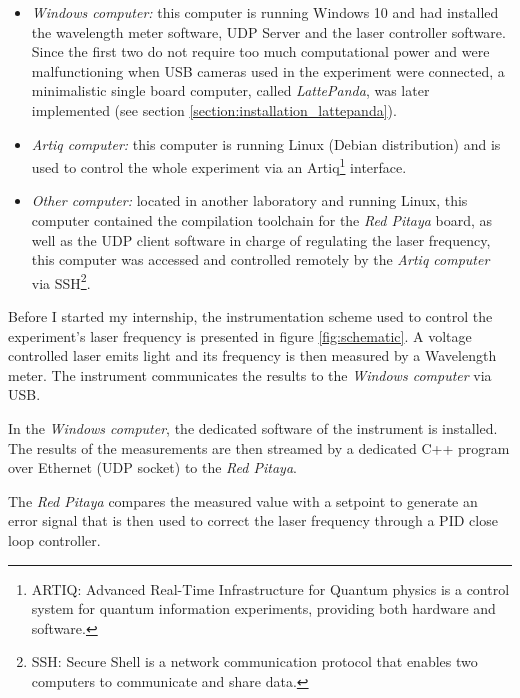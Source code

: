 \documentclass[a4paper,12pt]{article}
\begin{document}
\begin{itemize}
\itemsep 0em %
    \item \textit{Windows computer:} this computer is running Windows 10 and had installed the wavelength meter software, UDP Server and the laser controller software. Since the first two do not require too much computational power and were malfunctioning when USB cameras used in the experiment were connected, a minimalistic single board computer, called \textit{LattePanda}, was later implemented (see section \ref{section:installation_lattepanda}).
    \item \textit{Artiq computer:} this computer is running Linux (Debian distribution) and is used to control the whole experiment via an Artiq\footnote{ARTIQ: Advanced Real-Time Infrastructure for Quantum physics is a control system for quantum information experiments, providing both hardware and software.} interface.
    \item \textit{Other computer:} located in another laboratory and running Linux, this computer contained the compilation toolchain for the \textit{Red Pitaya} board, as well as the UDP client software in charge of regulating the laser frequency, this computer was accessed and controlled remotely by the \textit{Artiq computer} via SSH\footnote{SSH: Secure Shell is a network communication protocol that enables two computers to communicate and share data.}.
\end{itemize}


Before I started my internship, the instrumentation scheme used to control the experiment's laser frequency is presented in figure \ref{fig:schematic}. A voltage controlled laser emits light and its frequency is then measured by a Wavelength meter. The instrument communicates the results to the \textit{Windows computer} via USB.

In the \textit{Windows computer}, the dedicated software of the instrument is installed. The results of the measurements are then streamed by a dedicated C++ program over Ethernet (UDP socket) to the \textit{Red Pitaya}.

The \textit{Red Pitaya} compares the measured value with a setpoint to generate an error signal that is then used to correct the laser frequency through a PID close loop controller.
\end{document}
